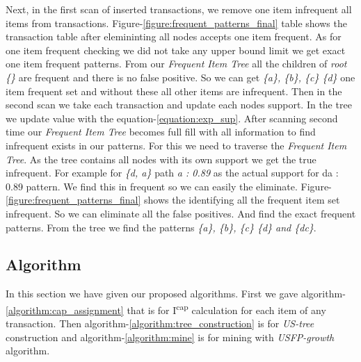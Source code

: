 	Next, in the first scan of inserted transactions, we remove one item infrequent all items from transactions. Figure-\ref{figure:frequent_patterns_final} table shows the transaction table after elemininting all nodes accepts one item frequent. As for one item frequent checking we did not take any upper bound limit we get exact one item frequent patterns. From our \emph{Frequent Item Tree} all the children of \emph{root \{\}} are frequent and there is no false positive. So we can get \emph{\{a\}, \{b\}, \{c\} \{d\}} one item frequent set and without these all other items are infrequent.  Then in the second scan we take each transaction and update each nodes support. In the tree we update value with the equation-\ref{equation:exp_sup}. After scanning second time our \emph{Frequent Item Tree} becomes full fill with all information to find infrequent exists in our patterns. For this we need to traverse the \emph{Frequent Item Tree}. As the tree contains all nodes with its own support we get the true infrequent. For example for \emph{\{d, a\}} path \emph{a : 0.89} as the actual support for {da : 0.89} pattern. We find this in frequent so we can easily the eliminate. Figure-\ref{figure:frequent_patterns_final} shows the identifying all the frequent item set infrequent. So we can eliminate all the false positives.	And find the exact frequent patterns. From the tree we find the patterns \emph{\{a\}, \{b\}, \{c\} \{d\} and \{dc\}}.
	

	\subsection{Algorithm}
	In this section we have given our proposed algorithms. First we gave algorithm-\ref{algorithm:cap_assignment} that is for I\textsuperscript{cap} calculation for each item of any transaction. Then algorithm-\ref{algorithm:tree_construction} is for \emph{US-tree} construction and algorithm-\ref{algorithm:mine} is for mining with \emph{USFP-growth} algorithm.
	
	
	
\clearpage
